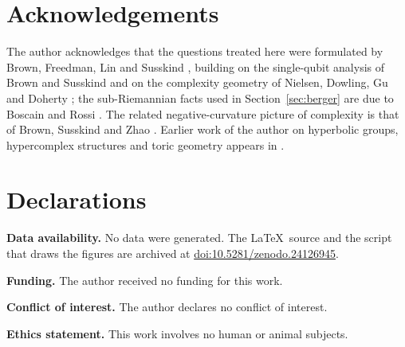 \documentclass[11pt]{amsart}
\theoremstyle{definition}
\newcommand{\zenodoCodeDOI}{10.5281/zenodo.24126945}
\begin{document}
\section*{Acknowledgements}

The author acknowledges that the questions treated here were formulated by Brown, Freedman, Lin and Susskind \cite{BFLS23}, building on the single-qubit analysis of Brown and Susskind \cite{BS19} and on the complexity geometry of Nielsen, Dowling, Gu and Doherty \cite{NDGD06}; the sub-Riemannian facts used in Section~\ref{sec:berger} are due to Boscain and Rossi \cite{BR08}. The related negative-curvature picture of complexity is that of Brown, Susskind and Zhao \cite{BSZ17}. Earlier work of the author on hyperbolic groups, hypercomplex structures and toric geometry appears in \cite{Bha22a,Bha22b,BSN26}.

\section*{Declarations}

\noindent\textbf{Data availability.} No data were generated. The \LaTeX\ source and the script that draws the figures are archived at \href{https://doi.org/\zenodoCodeDOI}{doi:\zenodoCodeDOI}.

\smallskip\noindent\textbf{Funding.} The author received no funding for this work.

\smallskip\noindent\textbf{Conflict of interest.} The author declares no conflict of interest.

\smallskip\noindent\textbf{Ethics statement.} This work involves no human or animal subjects.
\end{document}
